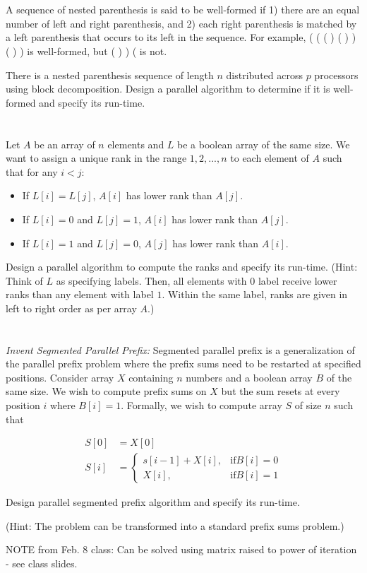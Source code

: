 \documentclass{article}
\newcommand{\aln}[1]{\begin{align*}#1\end{align*}}
\newcommand{\?}{\stackrel{?}{=}}
\begin{document}
\section{}

A sequence of nested parenthesis is said to be well-formed if 1) there are an equal number of left and right parenthesis, and 2) each right parenthesis is matched by a left parenthesis that occurs to its left in the sequence.
For example, ( ( ( ) ( ) ) ( ) ) is well-formed, but ( ) ) ( is not.

There is a nested parenthesis sequence of length $n$ distributed across $p$ processors using block decomposition.
Design a parallel algorithm to determine if it is well-formed and specify its run-time.

\section{}

Let $A$ be an array of $n$ elements and $L$ be a boolean array of the same size.
We want to assign a unique rank in the range $1, 2, ..., n$ to each element of $A$ such that for any $i < j$:
\begin{itemize}
\item If $L[i] = L[j]$, $A[i]$ has lower rank than $A[j]$.
\item If $L[i] = 0$ and $L[j] = 1$, $A[i]$ has lower rank than $A[j]$.
\item If $L[i] = 1$ and $L[j] = 0$, $A[j]$ has lower rank than $A[i]$.
\end{itemize}

Design a parallel algorithm to compute the ranks and specify its run-time.
(Hint: Think of $L$ as specifying labels.
Then, all elements with $0$ label receive lower ranks than any element with label $1$.
Within the same label, ranks are given in left to right order as per array $A$.)

\section{}

\textsl{Invent Segmented Parallel Prefix:}
Segmented parallel prefix is a generalization of the parallel prefix problem where the prefix sums need to be restarted at specified positions.
Consider array $X$ containing $n$ numbers and a boolean array $B$ of the same size.
We wish to compute prefix sums on $X$ but the sum resets at every position $i$ where $B[i] = 1$.
Formally, we wish to compute array $S$ of size $n$ such that

\aln{
  S[0] &= X[0]\\
  S[i] &=
    \begin{cases*}
      s[i-1] + X[i],&\text{if} B[i] = 0\\
      X[i],&\text{if} B[i] = 1
    \end{cases*}
}

Design parallel segmented prefix algorithm and specify its run-time.

(Hint: The problem can be transformed into a standard prefix sums problem.)

NOTE from Feb. 8 class: Can be solved using matrix raised to power of iteration - see class slides.
\end{document}
